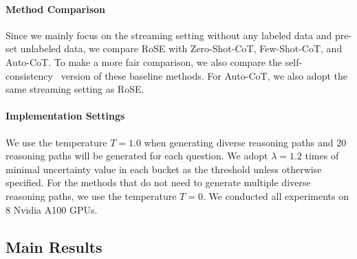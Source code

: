\documentclass[11pt]{article}
\begin{document}
\paragraph{Method Comparison} Since we mainly focus on the streaming setting without any labeled data and pre-set unlabeled data, we compare RoSE with Zero-Shot-CoT, Few-Shot-CoT, and Auto-CoT. To make a more fair comparison, we also compare the self-consistency~\cite{wang2023sc} version of these baseline methods. For Auto-CoT, we also adopt the same streaming setting as RoSE.

\paragraph{Implementation Settings} We use the temperature $T = 1.0$ when generating diverse reasoning paths and 20 reasoning paths will be generated for each question. We adopt $\lambda=1.2$ times of minimal uncertainty value in each bucket as the threshold unless otherwise specified. For the methods that do not need to generate multiple diverse reasoning paths, we use the temperature $T = 0$. We conducted all experiments on 8 Nvidia A100 GPUs.


\subsection{Main Results}


\end{document}
